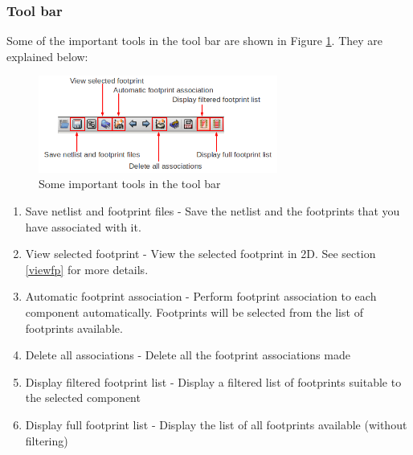 \subsubsection{Tool bar}
Some of the important tools in the tool bar are shown in Figure \ref{tb_fe}. They are explained below:
\begin{figure}
\centering
\includegraphics[width=0.7\textwidth]{figures/tb_fe}
\caption{Some important tools in the tool bar}
\label{tb_fe}
\end{figure}
\begin{enumerate}
\item Save netlist and footprint files - Save the netlist and the footprints that you have associated with it.
\item View selected footprint - View the selected footprint in 2D. See section \ref{viewfp} for more details.
\item Automatic footprint association - Perform footprint association to each component automatically. Footprints will be selected from the list of footprints available.
\item Delete all associations - Delete all the footprint associations made
\item Display filtered footprint list - Display a filtered list of footprints suitable to the selected component
\item Display full footprint list - Display the list of all footprints available (without filtering)
\end{enumerate}
